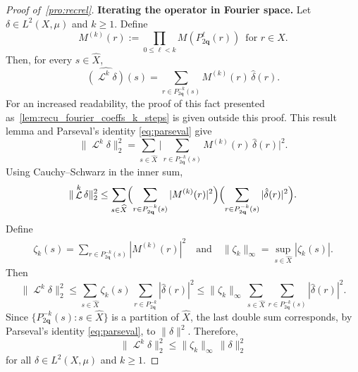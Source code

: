 \documentclass[12pt,reqno]{article}
\DeclareMathOperator{\Lop}{\mathcal{L}}
\begin{document}
\begin{proof}[Proof of~\cref{pro:recrel}]
{\bf Iterating the operator in Fourier space.} Let $\delta \in L^2(X,\mu)$ and $k \ge 1$.
Define 
\[  M^{(k)}(r) := \prod_{0 \le \ell < k}
    M(P_{2\mathbf{q}}^\ell(r))
    \enspace 
    \text{for $r \in \widehat X$.}
\]
Then, for every $s \in \widehat X$,
\[  \widehat{(\Lop^k\delta)}(s) = 
    \sum_{r\in P_{2\mathbf{q}}^{-k}(s)}
    M^{(k)}(r) \, \hat\delta(r).
  \]
For an increased readability, the proof of this fact presented as~\cref{lem:recu_fourier_coeffs_k_steps} is given outside this proof. This result lemma and Parseval's identity \eqref{eq:parseval} give
\[  \|\Lop^k\delta\|_2^2 = 
    \sum_{s\in\widehat X}
    \bigg|\sum_{r\in P_{2\mathbf{q}}^{-k}(s)} 
    M^{(k)}(r) \, \hat\delta(r)\bigg|^2.
\]
Using Cauchy--Schwarz in the inner sum,
\[
    \|\Lop^k\delta\|_2^2\le
    \sum_{s \in \widehat X}
    \Bigl(\sum_{r\in P_{2\mathbf{q}}^{-k}(s)} 
    |M^{(k)}(r)|^2\Bigr)
    \Bigl(\sum_{r\in P_{2\mathbf{q}}^{-k}(s)} |\hat\delta(r)|^2\Bigr).
\]
Define
\begin{align}
\label{eq:def xik}
\zeta_k(s) = 
    \sum_{r\in P_{2\mathbf{q}}^{-k}(s)} 
    |M^{(k)}(r)|^2
    \quad \text{and} \quad 
    \|\zeta_k\|_\infty = 
    \sup_{s \in \widehat X}
    |\zeta_k(s)|.
\end{align}
Then
\[
    \|\Lop^k\delta\|_2^2 \le
    \sum_{s\in\widehat X} 
    \zeta_k(s) \, 
    \sum_{r \in P_{2\mathbf{q}}^{-k}}
    |\hat\delta(r)|^2 \le 
    \|\zeta_k\|_\infty \, 
    \sum_{s \in \widehat X}
    \sum_{r \in P_{2\mathbf{q}}^{-k}(s)}
    |\hat\delta(r)|^2.
\]
Since $\{P_{2\mathbf{q}}^{-k}(s) : s \in \widehat X\}$ is a partition of $\widehat X$, the last double sum corresponds, by Parseval's identity \eqref{eq:parseval}, to $\|\delta\|^2$.
Therefore,
\begin{equation}
    \label{eq:norm_contraction:general_k}
    \|\Lop^k\delta\|_2^2 \le
    \|\zeta_k\|_\infty \, 
    \|\delta\|_2^2
\end{equation}
for all $\delta \in L^2(X,\mu)$ and $k \ge 1$.


\end{proof}
\end{document}
